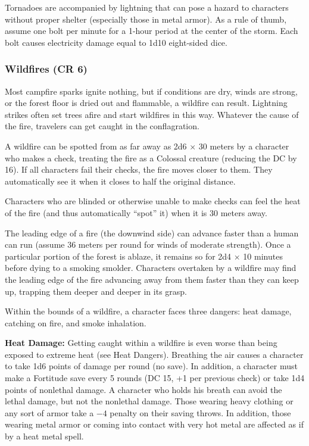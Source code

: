 Tornadoes are accompanied by lightning that can pose a hazard to characters without proper shelter (especially those in metal armor). As a rule of thumb, assume one bolt per minute for a 1-hour period at the center of the storm. Each bolt causes electricity damage equal to 1d10 eight-sided dice.

\subsubsection{Wildfires (CR 6)}
Most campfire sparks ignite nothing, but if conditions are dry, winds are strong, or the forest floor is dried out and flammable, a wildfire can result. Lightning strikes often set trees afire and start wildfires in this way. Whatever the cause of the fire, travelers can get caught in the conflagration.

A wildfire can be spotted from as far away as 2d6 $\times$ 30 meters by a character who makes a  check, treating the fire as a Colossal creature (reducing the DC by 16). If all characters fail their  checks, the fire moves closer to them. They automatically see it when it closes to half the original distance.

Characters who are blinded or otherwise unable to make  checks can feel the heat of the fire (and thus automatically ``spot'' it) when it is 30 meters away.

The leading edge of a fire (the downwind side) can advance faster than a human can run (assume 36 meters per round for winds of moderate strength). Once a particular portion of the forest is ablaze, it remains so for 2d4 $\times$ 10 minutes before dying to a smoking smolder. Characters overtaken by a wildfire may find the leading edge of the fire advancing away from them faster than they can keep up, trapping them deeper and deeper in its grasp.

Within the bounds of a wildfire, a character faces three dangers: heat damage, catching on fire, and smoke inhalation.

\textbf{Heat Damage:} Getting caught within a wildfire is even worse than being exposed to extreme heat (see Heat Dangers). Breathing the air causes a character to take 1d6 points of damage per round (no save). In addition, a character must make a Fortitude save every 5 rounds (DC 15, +1 per previous check) or take 1d4 points of nonlethal damage. A character who holds his breath can avoid the lethal damage, but not the nonlethal damage. Those wearing heavy clothing or any sort of armor take a $-4$ penalty on their saving throws. In addition, those wearing metal armor or coming into contact with very hot metal are affected as if by a heat metal spell.

